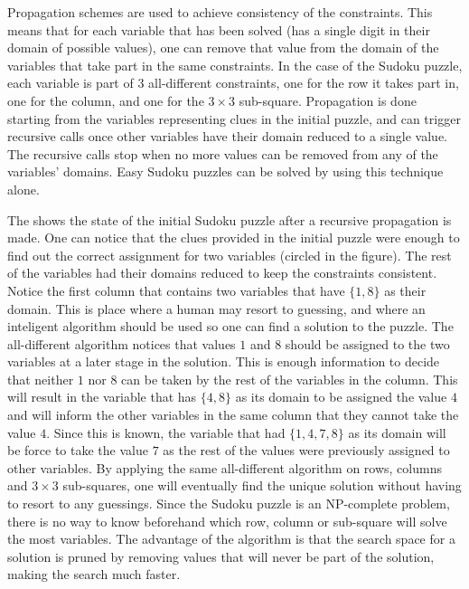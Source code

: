 \documentclass{l4proj}
\begin{document}
\noindent Propagation schemes are used to achieve consistency of the constraints. This means that for each variable that has been solved (has a single digit in their domain of possible values), one can remove that value from the domain of the variables that take part in the same constraints. In the case of the Sudoku puzzle, each variable is part of $3$ all-different constraints, one for the row it takes part in, one for the column, and one for the $3\times 3$ sub-square. Propagation is done starting from the variables representing clues in the initial puzzle, and can trigger recursive calls once other variables have their domain reduced to a single value. The recursive calls stop when no more values can be removed from any of the variables' domains. Easy Sudoku puzzles can be solved by using this technique alone.

\noindent The  shows the state of the initial Sudoku puzzle after a recursive propagation is made. One can notice that the clues provided in the initial puzzle were enough to find out the correct assignment for two variables (circled in the figure). The rest of the variables had their domains reduced to keep the constraints consistent. Notice the first column that contains two variables that have $\{1, 8\}$ as their domain. This is place where a human may resort to guessing, and where an inteligent algorithm should be used so one can find a solution to the puzzle. The all-different algorithm notices that values $1$ and $8$ should be assigned to the two variables at a later stage in the solution. This is enough information to decide that neither $1$ nor $8$ can be taken by the rest of the variables in the column. This will result in the variable that has $\{4, 8\}$ as its domain to be assigned the value $4$ and will inform the other variables in the same column that they cannot take the value $4$. Since this is known, the variable that had $\{1, 4, 7, 8\}$ as its domain will be force to take the value $7$ as the rest of the values were previously assigned to other variables. By applying the same all-different algorithm on rows, columns and $3\times 3$ sub-squares, one will eventually find the unique solution without having to resort to any guessings. Since the Sudoku puzzle is an NP-complete problem, there is no way to know beforehand which row, column or sub-square will solve the most variables. The advantage of the algorithm is that the search space for a solution is pruned by removing values that will never be part of the solution, making the search much faster.
\end{document}
